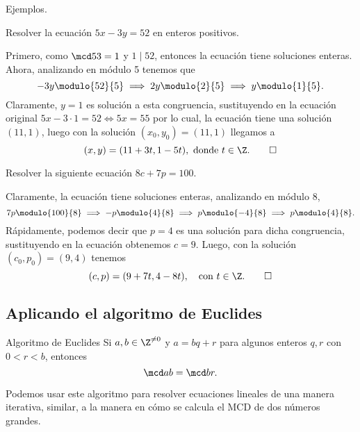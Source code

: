 Ejemplos.
\begin{example}
    Resolver la ecuación $5x - 3y = 52$ en enteros positivos.
\end{example}
\begin{solution}
    Primero, como $\mcd 5 3 = 1$ y $1 \mid 52$, entonces la ecuación tiene soluciones enteras.
    Ahora, analizando en módulo 5 tenemos que
    \[
        - 3y \modulo{52}{5} \implies 2y \modulo{2}{5} \implies y \modulo{1}{5}.
    \]
    Claramente, $y = 1$ es solución a esta congruencia, sustituyendo en la ecuación original $5x - 3\cdot 1 = 52 \iff 5x = 55$
    por lo cual, la ecuación tiene una solución $(11, 1)$, luego con la solución $(x_0,y_0)=(11,1)$ llegamos a
    \[
        (x,y) = (11+3t,1-5t), \mbox{ donde } t\in \Z.\qedhere
    \]
\end{solution}

\begin{example}
    Resolver la siguiente ecuación $8c+7p=100$.
\end{example}
\begin{solution}
    Claramente, la ecuación tiene soluciones enteras, analizando en módulo 8,
    \[
        7p \modulo{100}{8} \implies -p \modulo{4}{8} \implies p \modulo{-4}{8} \implies p \modulo{4}{8}.
    \]
    Rápidamente, podemos decir que $p = 4$ es una solución para dicha congruencia, sustituyendo en la ecuación obtenemos $c = 9$.
    Luego, con la solución $(c_0, p_0) = (9, 4)$ tenemos
    \[
        (c,p) = (9 + 7t, 4 - 8t),\quad \text{con}\ t\in \Z.\qedhere
    \]
\end{solution}



\subsection{Aplicando el algoritmo de Euclides}

\begin{definition.box}{Algoritmo de Euclides}{}
    Si $a, b \in \Z^{\neq 0}$ y $a = bq + r$ para algunos enteros $q,r$ con $0 < r < b$, entonces
    \[
        \mcd a b = \mcd b r.
    \]
\end{definition.box}

Podemos usar este algoritmo para resolver ecuaciones lineales de una manera iterativa, similar, a la manera en cómo
se calcula el MCD de dos números grandes.

